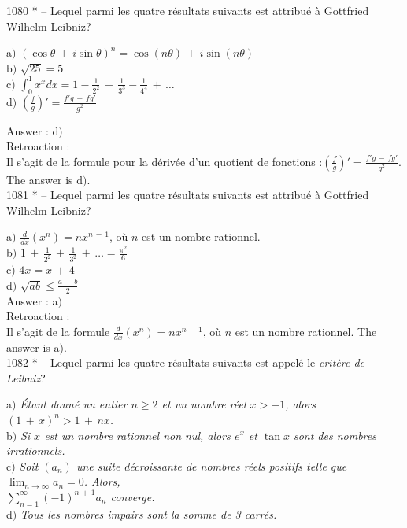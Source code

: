 ﻿\documentclass[letterpaper, 12pt]{article}
\begin{document}
1080 * -- Lequel parmi les quatre r\'esultats suivants est
attribu\'e \`a Gottfried Wilhelm Leibniz?

a$)$
$(\cos\theta\,+\,i\sin\theta)^n=\cos(n\theta)\,+\,i\sin(n\theta)$
\\ [2mm] b$)$ $\sqrt{25}=5$ \\ [3 mm] c$)$
$\int_0^1x^xdx=1-\frac1{2^2}\,+\,\frac1{3^3}-\frac1{4^4}\,+\,\ldots$ \\
[2mm] d$)$ $\left(\frac fg\right)'=\frac{f'g\,-\,fg'}{g^2}$

Answer : d$)$\\

Retroaction : \\
Il s'agit de la formule pour la d\'eriv\'ee d'un quotient de
fonctions :$\left(\frac fg\right)'=\frac{f'g\,-\,fg'}{g^2}$.
The answer is d$)$.\\

1081 * -- Lequel parmi les quatre r\'esultats suivants est
attribu\'e \`a Gottfried Wilhelm Leibniz?

a$)$ $\frac d{dx}(x^n)=nx^{n\,-\,1}$, o\`u $n$ est un nombre
rationnel.
\\ [2mm] b$)$ $1\,+\,\frac1{2^2}\,+\,\frac1{3^2}\,+\,\ldots=\frac{\pi^2}6$
\\ [3 mm] c$)$ $4x=x\,+\,4$ \\ [2mm]
d$)$ $\sqrt{ab}\le\frac{a\,+\,b}2$\\

Answer : a$)$\\

Retroaction : \\
Il s'agit de la formule $\frac d{dx}(x^n)=nx^{n\,-\,1}$, o\`u $n$
est un nombre rationnel.
The answer is a$)$.\\

1082 * -- Lequel parmi les quatre r\'esultats suivants est appel\'e
le {\sl crit\`ere de Leibniz}?

a$)$ {\sl \'Etant donn\'e un entier $n\ge2$ et un nombre r\'eel $x>-1$,
alors $(1\,+\,x)^n>1\,+\,nx$.} \\[2mm]
b$)$ {\sl Si $x$ est un nombre rationnel non nul, alors $e^x$ et $\tan x$
sont des nombres irrationnels.} \\[2mm]
c$)$ {\sl Soit $(a_n)$ une suite d\'ecroissante de nombres r\'eels positifs
telle que $\lim_{n\to\infty}a_n=0$.  Alors, \\[2mm]
$\sum_{n=1}^{\infty}(-1)^{n\,+\,1}a_n$ converge.} \\[2mm]
d$)$ {\sl Tous les nombres impairs sont la somme de 3 carr\'es.}
\end{document}
